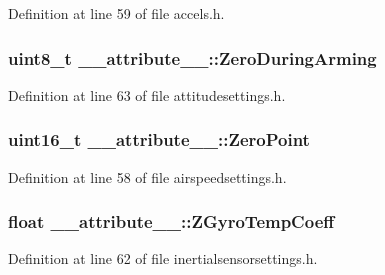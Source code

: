 \-Definition at line 59 of file accels.\-h.

\hypertarget{struct____attribute_____adf3787c76989853c1a9c679b90367e7d}{
\subsubsection[{\-Zero\-During\-Arming}]{\setlength{\rightskip}{0pt plus 5cm}uint8\-\_\-t {\bf \-\_\-\-\_\-attribute\-\_\-\-\_\-\-::\-Zero\-During\-Arming}}}\label{struct____attribute_____adf3787c76989853c1a9c679b90367e7d}


\-Definition at line 63 of file attitudesettings.\-h.

\hypertarget{struct____attribute_____aaa038632b9eeba4ceb451d352395c837}{
\subsubsection[{\-Zero\-Point}]{\setlength{\rightskip}{0pt plus 5cm}uint16\-\_\-t {\bf \-\_\-\-\_\-attribute\-\_\-\-\_\-\-::\-Zero\-Point}}}\label{struct____attribute_____aaa038632b9eeba4ceb451d352395c837}


\-Definition at line 58 of file airspeedsettings.\-h.

\hypertarget{struct____attribute_____a3db1ab539d7ee25b918bf0e27ebf3f05}{
\subsubsection[{\-Z\-Gyro\-Temp\-Coeff}]{\setlength{\rightskip}{0pt plus 5cm}float {\bf \-\_\-\-\_\-attribute\-\_\-\-\_\-\-::\-Z\-Gyro\-Temp\-Coeff}}}\label{struct____attribute_____a3db1ab539d7ee25b918bf0e27ebf3f05}


\-Definition at line 62 of file inertialsensorsettings.\-h.



